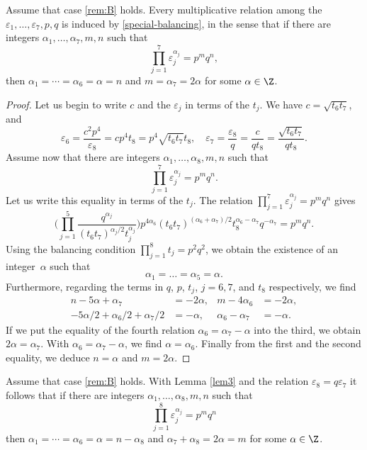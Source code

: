 \begin{lem}\label{lem3}
Assume that case \eqref{rem:B} holds. Every multiplicative relation among the $\varepsilon_{1},\dots,\varepsilon_{7},p,q$ is induced by \eqref{special-balancing}, in the sense that if there are integers $\alpha_{1},\dots,\alpha_{7},m,n$ such that
\[
\prod_{j=1}^{7}\varepsilon_{j}^{\alpha_{j}} =p^{m}q^{n},
\]
then $\alpha_{1}=\cdots=\alpha_{6}=\alpha=n$ and $m=\alpha_7=2\alpha$ for some $\alpha\in \Z$.
\end{lem}

\begin{proof}
Let us begin to write $c$ and the $\varepsilon_{j}$ in terms of the $t_{j}$. We have $c=\sqrt{t_{6}t_{7}}$, and
\[
\varepsilon_{6}=\frac{c^{2}p^{4}}{\varepsilon_{8}}=cp^{4}t_{8}=p^{4}\sqrt{t_{6}t_{7}}t_{8},
\quad \varepsilon_{7}=\frac{\varepsilon_{8}}{q}=\frac{c}{qt_{8}}=\frac{\sqrt{t_{6}t_{7}}}{qt_{8}}.
\]
Assume now that there are integers $\alpha_{1},\dots,\alpha_{8},m,n$ such that
\[
\prod_{j=1}^{7}\varepsilon_{j}^{\alpha_{j}} =p^{m}q^{n}.
\]
Let us write this equality in terms of the $t_{j}$. The relation $\prod_{j=1}^{7}\varepsilon_{j}^{\alpha_{j}}=p^{m}q^{n}$ gives
\begin{equation}\label{eq2}
\biggl(\prod_{j=1}^{5}\frac{q^{\alpha_{j}}}{(t_{6}t_{7})^{\alpha_{j}/2}t_{j}^{\alpha_{j}}}\biggr) p^{4\alpha_{6}} (t_{6}t_{7})^{(\alpha_{6}+\alpha_{7})/2}t_{8}^{\alpha_{6}-\alpha_{7}}q^{-\alpha_{7}}=p^{m}q^{n}.
\end{equation}
Using the balancing condition $\prod_{j=1}^{8}t_{j} =p^{2}q^{2}$, we obtain the existence of an integer~$\alpha$ such that
\[
\alpha_{1}=\dots=\alpha_{5}=\alpha.
\]
Furthermore, regarding the terms in $q$, $p$, $t_{j}$, $j=6,7$, and $t_{8}$ respectively, we find
\[
\begin{aligned}
n-5\alpha+\alpha_{7}&=-2\alpha,& m-4\alpha_{6}&=-2\alpha,\\
-5\alpha/2+\alpha_{6}/2+\alpha_{7}/2&=-\alpha, & \alpha_{6}-\alpha_{7}&=-\alpha.\end{aligned}
\]
If we put the equality of the fourth relation $\alpha_{6}=\alpha_{7}-\alpha$ into the third, we obtain
$2\alpha=\alpha_{7}$. With $\alpha_{6}=\alpha_{7}-\alpha$, we find $\alpha=\alpha_{6}$. Finally from the first and the second equality, we deduce $n=\alpha$ and $m= 2\alpha$.\end{proof}

\begin{remark}
Assume that case \eqref{rem:B} holds. With Lemma \ref{lem3} and the relation $\varepsilon_{8}=q\varepsilon_{7}$ it follows that if there are integers $\alpha_{1},\dots,\alpha_{8},m,n$ such that
\[
\prod_{j=1}^{8}\varepsilon_{j}^{\alpha_{j}} =p^{m}q^{n}
\]
then $\alpha_{1}=\cdots=\alpha_{6}=\alpha=n-\alpha_8$ and $\alpha_7+\alpha_8=2\alpha=m$ for some $\alpha\in \Z$.
\end{remark}

